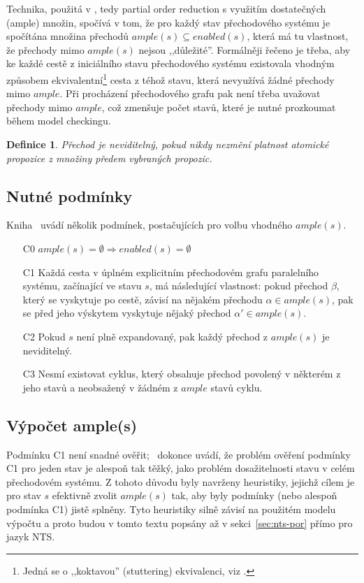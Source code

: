 \documentclass{fithesis2}
\newtheorem{definition}{Definice}
\begin{document}
Technika, použitá v \cite{CLARKE}, tedy partial order reduction s využitím dostatečných (ample) množin, spočívá v tom, že pro každý stav přechodového systému je spočítána množina přechodů $\mathit{ample}(s) \subseteq \mathit{enabled}(s)$, která má tu vlastnost, že přechody mimo $\mathit{ample}(s)$ nejsou ,,důležité''. Formálněji řečeno je třeba, aby ke každé cestě z iniciálního stavu přechodového systému existovala vhodným způsobem ekvivalentní\footnote{Jedná se o ,,koktavou'' (stuttering) ekvivalenci, viz \cite{CLARKE}.} cesta z téhož stavu, která nevyužívá žádné přechody mimo $\mathit{ample}$. Při procházení přechodového grafu pak není třeba uvažovat přechody mimo $\mathit{ample}$, což zmenšuje počet stavů, které je nutné prozkoumat během model checkingu.

\begin{definition}
Přechod je neviditelný, pokud nikdy nezmění platnost atomické propozice z množiny předem vybraných propozic.
\end{definition}

\subsection{Nutné podmínky}
\label{subsec:por:ample-conditions}
Kniha~\cite{CLARKE} uvádí několik podmínek, postačujících pro volbu vhodného $\mathit{ample}(s)$.

\begin{enumerate}
\item[C0] $\mathit{ample}(s) = \emptyset \Rightarrow \mathit{enabled}(s) = \emptyset$
\item[C1] Každá cesta v úplném explicitním přechodovém grafu paralelního systému, začínající ve stavu $s$, má následující vlastnost: pokud přechod $\beta$, který se vyskytuje po cestě, závisí na nějakém přechodu $\alpha \in \mathit{ample}(s)$, pak se před jeho výskytem vyskytuje nějaký přechod $\alpha' \in \mathit{ample}(s)$.
\item[C2] Pokud $s$ není plně expandovaný, pak každý přechod z $\mathit{ample}(s)$ je neviditelný.
\item[C3] Nesmí existovat cyklus, který obsahuje přechod povolený v některém z jeho stavů a neobsažený v žádném z $\mathit{ample}$ stavů cyklu.
\end{enumerate}

\subsection{Výpočet ample(s)}
\label{subsec:por-compute-ample}
Podmínku C1 není snadné ověřit; \cite{CLARKE}~dokonce uvádí, že problém ověření podmínky C1 pro jeden stav je alespoň tak těžký, jako problém dosažitelnosti stavu v celém přechodovém systému. Z tohoto důvodu byly navrženy heuristiky, jejichž cílem je pro stav $s$ efektivně zvolit $ample(s)$ tak, aby byly podmínky (nebo alespoň podmínka C1) jistě splněny. Tyto heuristiky silně závisí na použitém modelu výpočtu a proto budou v tomto textu popsány až v sekci~\ref{sec:nts-por} přímo pro jazyk NTS.
\end{document}
